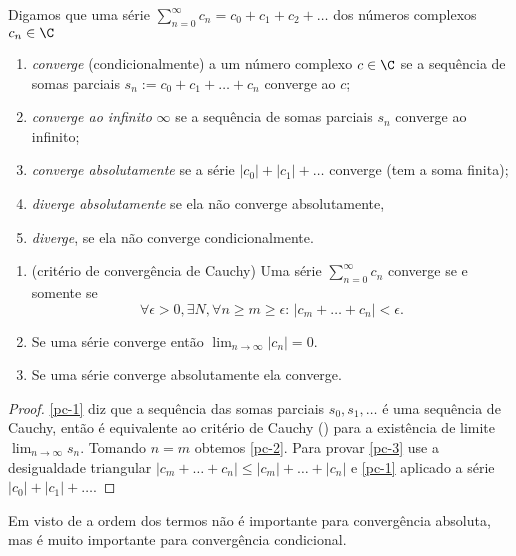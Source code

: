\begin{defin}
Digamos que uma série $\sum_{n=0}^\infty c_n = c_0 + c_1 + c_2 + \dots$ dos números complexos $c_n\in\C$
\begin{enumerate}
\item \emph{converge} (condicionalmente) a um número complexo $c\in \C$ se a sequência de somas parciais
$s_n := c_0 + c_1 + \dots + c_n$ converge ao $c$;
\item \emph{converge ao infinito} $\infty$ se a sequência de somas parciais $s_n$
converge ao infinito;
\item \emph{converge absolutamente} se a série $|c_0| + |c_1| + \dots$ converge (tem a soma finita);
\item \emph{diverge absolutamente} se ela não converge absolutamente,
\item \emph{diverge}, se ela não converge condicionalmente.
\end{enumerate}
\end{defin}

\begin{prop}
\label{p:convergencia}
\begin{enumerate}
\item \label{pc-1} (critério de convergência de Cauchy) Uma série $\sum_{n=0}^\infty c_n$ converge se e somente se
\[ \forall \epsilon>0, \exists N, \forall n\geq m\geq \epsilon:\, |c_m + \dots + c_n| < \epsilon .\]
\item \label{pc-2} Se uma série converge então $\lim_{n\to\infty} |c_n| = 0$.
\item \label{pc-3} Se uma série converge absolutamente ela converge.
\end{enumerate}
\end{prop}
\begin{proof}
\eqref{pc-1} diz que a sequência das somas parciais $s_0,s_1,\dots$ é uma sequência de Cauchy,
então é equivalente ao critério de Cauchy () para a existência de limite $\lim_{n\to\infty} s_n$.
Tomando $n=m$ obtemos \eqref{pc-2}.
Para provar \eqref{pc-3} use a desigualdade triangular
$|c_m + \dots + c_n| \leq |c_m| + \dots + |c_n|$
e \eqref{pc-1} aplicado a série $|c_0| + |c_1| + \dots$.
\end{proof}

Em visto de 
a ordem dos termos não é importante para convergência absoluta,
mas é muito importante para convergência condicional.

